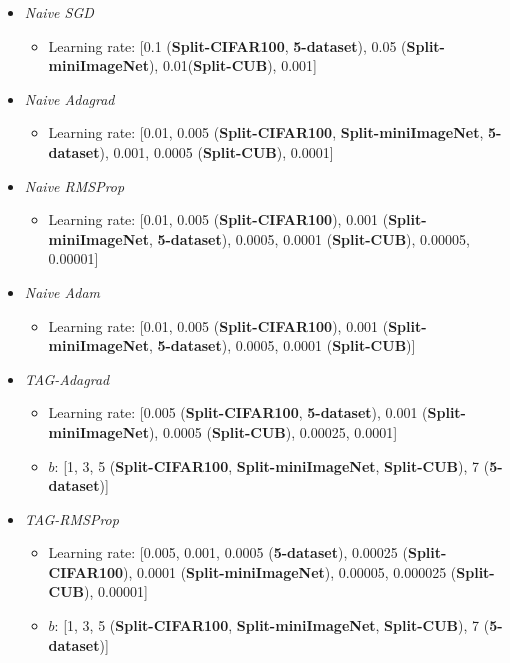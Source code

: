 \documentclass{article} \usepackage{collas2022_conference,times}
\begin{document}
\begin{itemize}
    \item \textit{Naive SGD}
    \begin{itemize}
        \item Learning rate: [0.1 (\textbf{Split-CIFAR100}, \textbf{5-dataset}), 0.05 (\textbf{Split-miniImageNet}), 0.01(\textbf{Split-CUB}), 0.001]
    \end{itemize}
    \item \textit{Naive Adagrad}
    \begin{itemize}
        \item Learning rate: [0.01, 0.005 (\textbf{Split-CIFAR100}, \textbf{Split-miniImageNet}, \textbf{5-dataset}), 0.001, 0.0005 (\textbf{Split-CUB}), 0.0001]
    \end{itemize}
    \item \textit{Naive RMSProp}
    \begin{itemize}
        \item Learning rate: [0.01, 0.005 (\textbf{Split-CIFAR100}), 0.001 (\textbf{Split-miniImageNet}, \textbf{5-dataset}), 0.0005, 0.0001 (\textbf{Split-CUB}), 0.00005, 0.00001]
    \end{itemize}
    \item \textit{Naive Adam}
    \begin{itemize}
        \item Learning rate: [0.01, 0.005 (\textbf{Split-CIFAR100}), 0.001 (\textbf{Split-miniImageNet}, \textbf{5-dataset}), 0.0005, 0.0001 (\textbf{Split-CUB})]
    \end{itemize}
    \item \textit{TAG-Adagrad}
    \begin{itemize}
        \item Learning rate: [0.005 (\textbf{Split-CIFAR100}, \textbf{5-dataset}), 0.001 (\textbf{Split-miniImageNet}), 0.0005  (\textbf{Split-CUB}), 0.00025, 0.0001]
        \item $b$: [1, 3, 5 (\textbf{Split-CIFAR100}, \textbf{Split-miniImageNet}, \textbf{Split-CUB}), 7 (\textbf{5-dataset})] 
    \end{itemize}
    \item \textit{TAG-RMSProp}
    \begin{itemize}
        \item Learning rate: [0.005, 0.001, 0.0005 (\textbf{5-dataset}), 0.00025 (\textbf{Split-CIFAR100}), 0.0001 (\textbf{Split-miniImageNet}), 0.00005, 0.000025 (\textbf{Split-CUB}), 0.00001]
        \item $b$: [1, 3, 5 (\textbf{Split-CIFAR100}, \textbf{Split-miniImageNet}, \textbf{Split-CUB}), 7 (\textbf{5-dataset})] 

\end{itemize}
\end{itemize}
\end{document}
